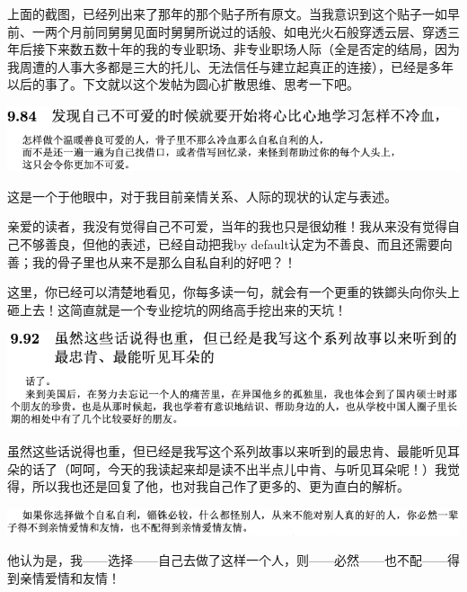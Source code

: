\documentclass[9pt, b5paper]{article}
\begin{document}
上面的截图，已经列出来了那年的那个贴子所有原文。当我意识到这个贴子一如早前、一两个月前同舅舅见面时舅舅所说过的话般、如电光火石般穿透云层、穿透三年后接下来数五数十年的我的专业职场、非专业职场人际（全是否定的结局，因为我周遭的人事大多都是三大的托儿、无法信任与建立起真正的连接），已经是多年以后的事了。下文就以这个发帖为圆心扩散思维、思考一下吧。 

\begin{center}
\includegraphics[width=.9\linewidth]{./pic/backups_plans_20210413_130937.png}
\end{center}

这是一个于他眼中，对于我目前亲情关系、人际的现状的认定与表述。

亲爱的读者，我没有觉得自己不可爱，当年的我也只是很幼稚！我从来没有觉得自己不够善良，但他的表述，已经自动把我by default认定为不善良、而且还需要向善；我的骨子里也从来不是那么自私自利的好吧？！

这里，你已经可以清楚地看见，你每多读一句，就会有一个更重的铁鎯头向你头上砸上去！这简直就是一个专业挖坑的网络高手挖出来的天坑！

\begin{center}
\includegraphics[width=.9\linewidth]{./pic/backups_plans_20210413_140845.png}
\end{center}

虽然这些话说得也重，但已经是我写这个系列故事以来听到的最忠肯、最能听见耳朵的话了（呵呵，今天的我读起来却是读不出半点儿中肯、与听见耳朵呢！）我觉得，所以我也还是回复了他，也对我自己作了更多的、更为直白的解析。

\begin{center}
\includegraphics[width=.9\linewidth]{./pic/backups_plans_20210413_131134.png}
\end{center}

他认为是，我——选择——自己去做了这样一个人，则——必然——也不配——得到亲情爱情和友情！
\end{document}
